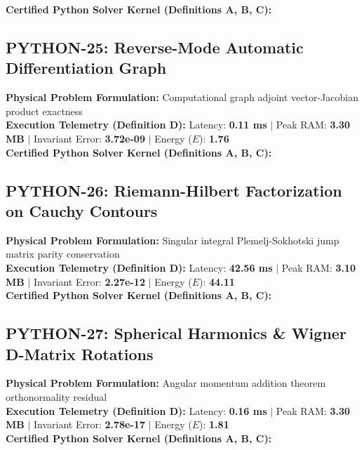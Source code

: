 \textbf{Certified Python Solver Kernel (Definitions A, B, C):}


\vspace{1em}
\subsection{PYTHON-25: Reverse-Mode Automatic Differentiation Graph}
\textbf{Physical Problem Formulation:} Computational graph adjoint vector-Jacobian product exactness\\
\textbf{Execution Telemetry (Definition D):} Latency: \textbf{0.11 ms} $|$ Peak RAM: \textbf{3.30 MB} $|$ Invariant Error: \textbf{3.72e-09} $|$ Energy ($E$): \textbf{1.76}\\

\textbf{Certified Python Solver Kernel (Definitions A, B, C):}


\vspace{1em}
\subsection{PYTHON-26: Riemann-Hilbert Factorization on Cauchy Contours}
\textbf{Physical Problem Formulation:} Singular integral Plemelj-Sokhotski jump matrix parity conservation\\
\textbf{Execution Telemetry (Definition D):} Latency: \textbf{42.56 ms} $|$ Peak RAM: \textbf{3.10 MB} $|$ Invariant Error: \textbf{2.27e-12} $|$ Energy ($E$): \textbf{44.11}\\

\textbf{Certified Python Solver Kernel (Definitions A, B, C):}


\vspace{1em}
\subsection{PYTHON-27: Spherical Harmonics \& Wigner D-Matrix Rotations}
\textbf{Physical Problem Formulation:} Angular momentum addition theorem orthonormality residual\\
\textbf{Execution Telemetry (Definition D):} Latency: \textbf{0.16 ms} $|$ Peak RAM: \textbf{3.30 MB} $|$ Invariant Error: \textbf{2.78e-17} $|$ Energy ($E$): \textbf{1.81}\\

\textbf{Certified Python Solver Kernel (Definitions A, B, C):}


